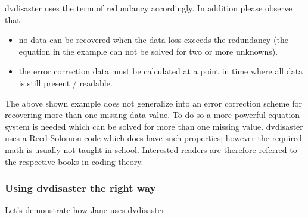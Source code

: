 dvdisaster uses the term of redundancy accordingly.
In addition please observe that

\begin{itemize}
\item  no data can be recovered when the data loss exceeds the
  redundancy (the equation in the example can not be solved for
  two or more unknowns).
\item the error correction data must be calculated at a
  point in time where all data is still present / readable.
\end{itemize}
  
The above shown example does not generalize into an error correction
scheme for recovering more than one missing data value. To do so a
more powerful equation system is needed which can be solved for more
than one missing value. dvdisaster uses a Reed-Solomon code which
does have such properties; however the required math is usually
not taught in school. Interested readers are therefore referred
to the respective books in coding theory. 

\newpage
\subsubsection{Using dvdisaster the right way}
\label{bigpicture-goodusage}

Let's demonstrate how Jane uses dvdisaster.

\bigskip


